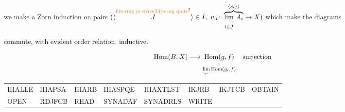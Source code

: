 we make a Zorn induction on pairs $(\inserted{\overset{\text{\unsure{filtering positive|filtering quite}}}{J}}\in I,\ u_J\colon \overbrace{\underset{i\in J}{\underset{\longrightarrow}{\lim}}\ A_i}^{\inserted{A_J}}\to X)$ which make the diagrams


commute, with evident order relation.  inductive.

\[
 \mathrm{Hom}(B,X)\longrightarrow
 \underset{\underset{\leftarrow}{\lim}\,\mathrm{Hom}(g_i,f)}{\underset{\scriptscriptstyle\shortparallel}{\mathrm{Hom}(g,f)}}\quad\text{surjection}
\]


{\tiny\ttfamily
\noindent\begin{tabular}{@{}llllllll@{}}
IHALLE & IHAPSA & IHARB & IHASPQE & IHAXTLST & IKJRB & IKJTCB & OBTAIN\\
OPEN & RDJFCB & READ & SYNADAF & SYNADRLS & WRITE
\end{tabular}}

